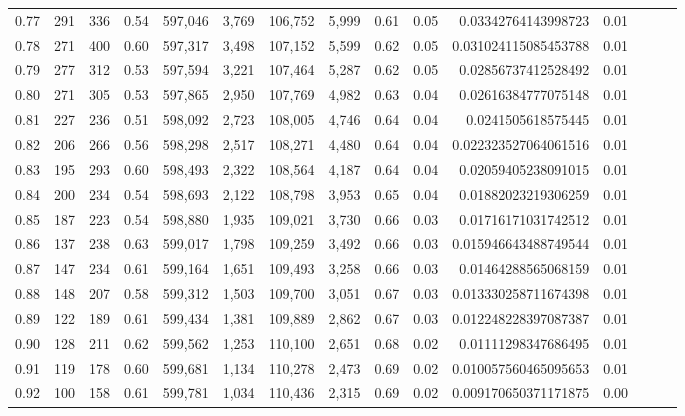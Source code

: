 \begin{tabular}{rrrrrrrrrrrrrrr}
0.77 &     291 &    336 &  0.54 &  597,046 &    3,769 &  106,752 &    5,999 &  0.61 &  0.05 &    0.03342764143998723 &      0.01 \\
0.78 &     271 &    400 &  0.60 &  597,317 &    3,498 &  107,152 &    5,599 &  0.62 &  0.05 &   0.031024115085453788 &      0.01 \\
0.79 &     277 &    312 &  0.53 &  597,594 &    3,221 &  107,464 &    5,287 &  0.62 &  0.05 &    0.02856737412528492 &      0.01 \\
0.80 &     271 &    305 &  0.53 &  597,865 &    2,950 &  107,769 &    4,982 &  0.63 &  0.04 &    0.02616384777075148 &      0.01 \\
0.81 &     227 &    236 &  0.51 &  598,092 &    2,723 &  108,005 &    4,746 &  0.64 &  0.04 &     0.0241505618575445 &      0.01 \\
0.82 &     206 &    266 &  0.56 &  598,298 &    2,517 &  108,271 &    4,480 &  0.64 &  0.04 &   0.022323527064061516 &      0.01 \\
0.83 &     195 &    293 &  0.60 &  598,493 &    2,322 &  108,564 &    4,187 &  0.64 &  0.04 &    0.02059405238091015 &      0.01 \\
0.84 &     200 &    234 &  0.54 &  598,693 &    2,122 &  108,798 &    3,953 &  0.65 &  0.04 &    0.01882023219306259 &      0.01 \\
0.85 &     187 &    223 &  0.54 &  598,880 &    1,935 &  109,021 &    3,730 &  0.66 &  0.03 &    0.01716171031742512 &      0.01 \\
0.86 &     137 &    238 &  0.63 &  599,017 &    1,798 &  109,259 &    3,492 &  0.66 &  0.03 &   0.015946643488749544 &      0.01 \\
0.87 &     147 &    234 &  0.61 &  599,164 &    1,651 &  109,493 &    3,258 &  0.66 &  0.03 &    0.01464288565068159 &      0.01 \\
0.88 &     148 &    207 &  0.58 &  599,312 &    1,503 &  109,700 &    3,051 &  0.67 &  0.03 &   0.013330258711674398 &      0.01 \\
0.89 &     122 &    189 &  0.61 &  599,434 &    1,381 &  109,889 &    2,862 &  0.67 &  0.03 &   0.012248228397087387 &      0.01 \\
0.90 &     128 &    211 &  0.62 &  599,562 &    1,253 &  110,100 &    2,651 &  0.68 &  0.02 &    0.01111298347686495 &      0.01 \\
0.91 &     119 &    178 &  0.60 &  599,681 &    1,134 &  110,278 &    2,473 &  0.69 &  0.02 &   0.010057560465095653 &      0.01 \\
0.92 &     100 &    158 &  0.61 &  599,781 &    1,034 &  110,436 &    2,315 &  0.69 &  0.02 &   0.009170650371171875 &      0.00 \\

\end{tabular}

